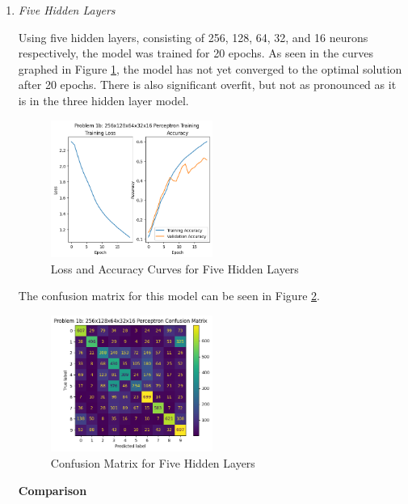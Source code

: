 \documentclass{article}
\begin{document}
\begin{enumerate}[label=1\alph*. ]
    \newpage
    \item \textit{Five Hidden Layers}
    
    Using five hidden layers, consisting of 256, 128, 64,
    32, and 16 neurons respectively, the model was trained
    for 20 epochs. As seen in the curves graphed in Figure
    \ref{fig:loss_1b}, the model has not yet converged to
    the optimal solution after 20 epochs. There is also
    significant overfit, but not as pronounced as it is in
    the three hidden layer model.
    \begin{figure}[h]
        \centering
        \includegraphics[width=0.5\textwidth]{images/loss_1b.png}
        \caption{Loss and Accuracy Curves for Five Hidden Layers}
        \label{fig:loss_1b}
    \end{figure}
    The confusion matrix for this model can be seen in
    Figure \ref{fig:confusion_1b}.
    \begin{figure}[h]
        \centering
        \includegraphics[width=0.5\textwidth]{images/conf_1b.png}
        \caption{Confusion Matrix for Five Hidden Layers}
        \label{fig:confusion_1b}
    \end{figure} 

\textbf{Comparison}


\end{enumerate}
\end{document}
